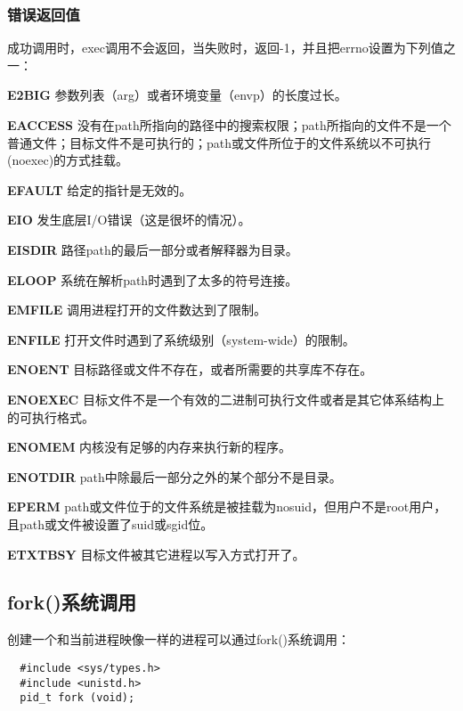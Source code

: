 \subsubsection{错误返回值}

成功调用时，exec调用不会返回，当失败时，返回-1，并且把errno设置为下列值之一：

\begin{eqlist*}
\item[\textbf{E2BIG}] 参数列表（arg）或者环境变量（envp）的长度过长。
\item[\textbf{EACCESS}] 没有在path所指向的路径中的搜索权限；path所指向的文件不是一个普通文件；目标文件不是可执行的；path或文件所位于的文件系统以不可执行(noexec)的方式挂载。
\item[\textbf{EFAULT}] 给定的指针是无效的。
\item[\textbf{EIO}] 发生底层I/O错误（这是很坏的情况）。
\item[\textbf{EISDIR}] 路径path的最后一部分或者解释器为目录。
\item[\textbf{ELOOP}] 系统在解析path时遇到了太多的符号连接。
\item[\textbf{EMFILE}] 调用进程打开的文件数达到了限制。
\item[\textbf{ENFILE}] 打开文件时遇到了系统级别（system-wide）的限制。
\item[\textbf{ENOENT}] 目标路径或文件不存在，或者所需要的共享库不存在。
\item[\textbf{ENOEXEC}] 目标文件不是一个有效的二进制可执行文件或者是其它体系结构上的可执行格式。
\item[\textbf{ENOMEM}] 内核没有足够的内存来执行新的程序。
\item[\textbf{ENOTDIR}] path中除最后一部分之外的某个部分不是目录。
\item[\textbf{EPERM}] path或文件位于的文件系统是被挂载为nosuid，但用户不是root用户，且path或文件被设置了suid或sgid位。
\item[\textbf{ETXTBSY}] 目标文件被其它进程以写入方式打开了。
\end{eqlist*}

\subsection{fork()系统调用}

创建一个和当前进程映像一样的进程可以通过fork()系统调用：

\begin{lstlisting}
  #include <sys/types.h>
  #include <unistd.h>
  pid_t fork (void);
\end{lstlisting}

